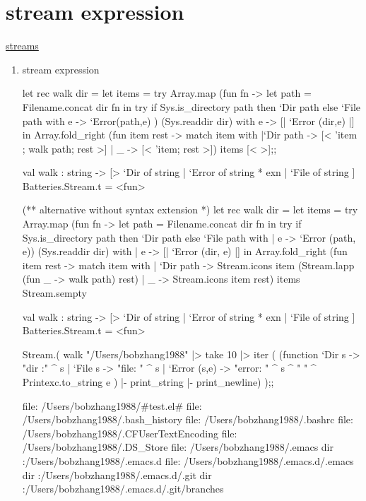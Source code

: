 \section{stream expression}

\href{http://mirror.ocamlcore.org/ocaml-tutorial.org/streams.html}{streams}

\begin{enumerate}
\item stream expression

 \begin{ocamlcode}

let rec walk dir = 
    let items = try 
      Array.map (fun fn -> let path = Filename.concat dir fn in 
             try if Sys.is_directory path then `Dir path else `File path
             with e -> `Error(path,e) ) (Sys.readdir dir)
      with e -> [| `Error (dir,e) |] in 
      Array.fold_right 
        (fun item rest -> match item with 
            |`Dir path -> [< 'item ; walk path; rest >]
            | _ -> [< 'item; rest >]) items [< >];;

val walk :
  string ->
  [> `Dir of string | `Error of string * exn | `File of string ]
  Batteries.Stream.t = <fun>
  
(** alternative without syntax extension *)
let rec walk dir =
  let items =
    try
      Array.map
        (fun fn ->
           let path = Filename.concat dir fn   in
             try if Sys.is_directory path 
                  then `Dir path 
                  else `File path
             with | e -> `Error (path, e))
        (Sys.readdir dir)
    with | e -> [| `Error (dir, e) |]
  in
    Array.fold_right
      (fun item rest ->
         match item with
         | `Dir path ->
             Stream.icons item (Stream.lapp (fun _ -> walk path) rest)
         | _ -> Stream.icons item rest)
      items Stream.sempty

val walk :
  string ->
  [> `Dir of string | `Error of string * exn | `File of string ]
  Batteries.Stream.t = <fun>
            
Stream.( walk   "/Users/bobzhang1988"
  |> take 10 |> iter 
  (
  (function `Dir s -> "dir :" ^ s 
     | `File s -> "file: " ^ s 
     | `Error (s,e) -> "error: " ^ s ^ " " ^ Printexc.to_string e
     )  |- print_string |- print_newline)
  );;

file: /Users/bobzhang1988/#test.el#
file: /Users/bobzhang1988/.bash_history
file: /Users/bobzhang1988/.bashrc
file: /Users/bobzhang1988/.CFUserTextEncoding
file: /Users/bobzhang1988/.DS_Store
file: /Users/bobzhang1988/.emacs
dir :/Users/bobzhang1988/.emacs.d
file: /Users/bobzhang1988/.emacs.d/.emacs
dir :/Users/bobzhang1988/.emacs.d/.git
dir :/Users/bobzhang1988/.emacs.d/.git/branches
            

\end{ocamlcode}
\end{enumerate}

